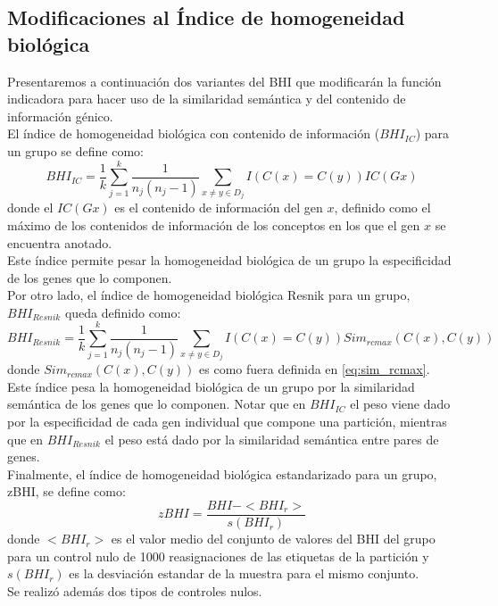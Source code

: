\subsection{Modificaciones al Índice de homogeneidad biológica}
\label{subsec:control_nulo}
Presentaremos a continuación dos variantes del BHI que modificarán la función indicadora para hacer uso de la similaridad semántica y del contenido de información génico.\\
El índice de homogeneidad biológica con contenido de información ($BHI_{IC}$) para un grupo se define como:
\begin{equation}
	BHI_{IC} = \frac{1}{k}\sum\limits_{j=1}^k\frac{1}{n_j(n_j-1)}\sum\limits_{x\neq y\in D_j}I(C(x)=C(y))IC(Gx)
\end{equation}
donde el $IC(Gx)$ es el contenido de información del gen $x$, definido como el máximo de los contenidos de información de los conceptos en los que el gen $x$ se encuentra anotado.\\
Este índice permite pesar la homogeneidad biológica de un grupo la especificidad de los genes que lo componen.\\
Por otro lado, el índice de homogeneidad biológica Resnik para un grupo, $BHI_{Resnik}$ queda definido como:
\begin{equation}
	BHI_{Resnik} = \frac{1}{k}\sum\limits_{j=1}^k\frac{1}{n_j(n_j-1)}\sum\limits_{x\neq y\in D_j}I(C(x)=C(y))Sim_{rcmax}(C(x), C(y))
\end{equation}
donde $Sim_{rcmax}(C(x), C(y))$ es como fuera definida en \ref{eq:sim_rcmax}.\\
Este índice pesa la homogeneidad biológica de un grupo por la similaridad semántica de los genes que lo componen. Notar que en $BHI_{IC}$ el peso viene dado por la especificidad de cada gen individual que compone una partición, mientras que en $BHI_{Resnik}$ el peso está dado por la similaridad semántica entre pares de genes.\\
Finalmente, el índice de homogeneidad biológica estandarizado para un grupo, zBHI, se define como:
\begin{equation}
	zBHI = \frac{BHI-<BHI_r>}{s(BHI_r)}
\end{equation}
donde $<BHI_r>$ es el valor medio del conjunto de valores del BHI del grupo para un control nulo de 1000 reasignaciones de las etiquetas de la partición y $s(BHI_r)$ es la desviación estandar de la muestra para el mismo conjunto.\\
Se realizó además dos tipos de controles nulos.\\
